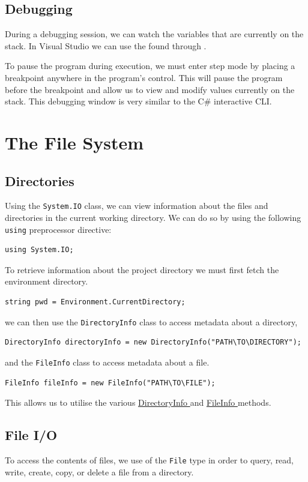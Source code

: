 \documentclass{article}
\begin{document}
\subsection{Debugging}
During a debugging session, we can watch the variables that are currently on the stack.
In Visual Studio we can use the  found through
.

To pause the program during execution, we must enter step mode by placing a breakpoint 
anywhere in the program's control. This will pause the program before the breakpoint 
and allow us to view and modify values currently on the stack. This debugging window
is very similar to the C\# interactive CLI. %
\section{The File System}
\subsection{Directories}
Using the \lstinline{System.IO} class, we can view information about the files and directories in 
the current working directory. We can do so by using the following \lstinline{using} preprocessor directive:
\begin{lstlisting}[numbers=none]
using System.IO;
\end{lstlisting}
To retrieve information about the project directory we must first fetch the environment directory.
\begin{lstlisting}[numbers=none]
string pwd = Environment.CurrentDirectory;
\end{lstlisting}
we can then use the \lstinline{DirectoryInfo} class to access metadata about a directory,
\begin{lstlisting}[numbers=none]
DirectoryInfo directoryInfo = new DirectoryInfo("PATH\TO\DIRECTORY");
\end{lstlisting}
and the \lstinline{FileInfo} class to access metadata about a file.
\begin{lstlisting}[numbers=none]
FileInfo fileInfo = new FileInfo("PATH\TO\FILE");
\end{lstlisting}
This allows us to utilise the various \href{https://docs.microsoft.com/en-us/dotnet/api/system.io.directoryinfo?view=net-6.0#methods}{DirectoryInfo }
and \href{https://docs.microsoft.com/en-us/dotnet/api/system.io.fileinfo?view=net-6.0#methods}{FileInfo } methods.
\subsection{File I/O}
To access the contents of files, we use of the \lstinline{File} type in order to query, read, write, create, copy, or delete a
file from a directory. 
\end{document}
